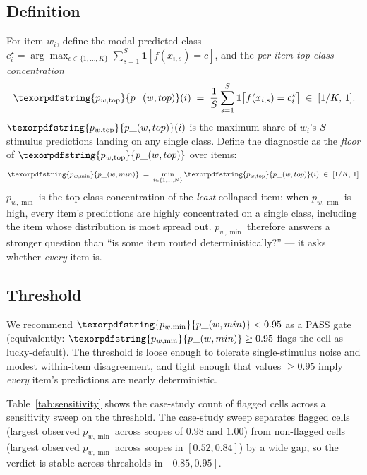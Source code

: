 \documentclass[11pt,letterpaper]{article}
\newcommand{\pwtop}{\texorpdfstring{\ensuremath{p_{w,\text{top}}}}{p\_(w,top)}}
\newcommand{\pwmin}{\texorpdfstring{\ensuremath{p_{w,\min}}}{p\_(w,min)}}
\begin{document}
\subsection{Definition}

For item $w_i$, define the modal predicted class
$c_i^\star = \arg\max_{c \in \{1, \ldots, K\}}
\sum_{s=1}^{S} \mathbf{1}[f(x_{i,s}) = c]$, and the
\emph{per-item top-class concentration}
\begin{equation}
  \pwtop(i)
  \;=\;
  \frac{1}{S}
  \sum_{s=1}^{S}
  \mathbf{1}\bigl[f(x_{i,s}) = c_i^\star\bigr]
  \;\in\; [1/K,\, 1].
  \label{eq:pwtopdef}
\end{equation}
$\pwtop(i)$ is the maximum share of $w_i$'s $S$ stimulus predictions
landing on any single class.  Define the diagnostic as the
\emph{floor} of $\pwtop$ over items:
\begin{equation}
  \pwmin
  \;=\;
  \min_{i \in \{1, \ldots, N\}} \pwtop(i)
  \;\in\; [1/K,\, 1].
  \label{eq:pwmin}
\end{equation}
\pwmin{} is the top-class concentration of the \emph{least}-collapsed
item: when \pwmin{} is high, every item's predictions are highly
concentrated on a single class, including the item whose distribution
is most spread out. \pwmin{} therefore answers a stronger question
than ``is some item routed deterministically?'' --- it asks whether
\emph{every} item is.

\subsection{Threshold}

We recommend $\pwmin < 0.95$ as a PASS gate (equivalently:
$\pwmin \geq 0.95$ flags the cell as lucky-default). The threshold
is loose enough to tolerate single-stimulus noise and modest
within-item disagreement, and tight enough that values $\geq 0.95$
imply \emph{every} item's predictions are nearly deterministic.

Table~\ref{tab:sensitivity} shows the case-study count of flagged
cells across a sensitivity sweep on the threshold. The case-study
sweep separates flagged cells (largest observed \pwmin{} across
scopes of $0.98$ and $1.00$) from non-flagged cells (largest
observed \pwmin{} across scopes in $[0.52, 0.84]$) by a wide gap,
so the verdict is stable across thresholds in $[0.85, 0.95]$.
\end{document}
